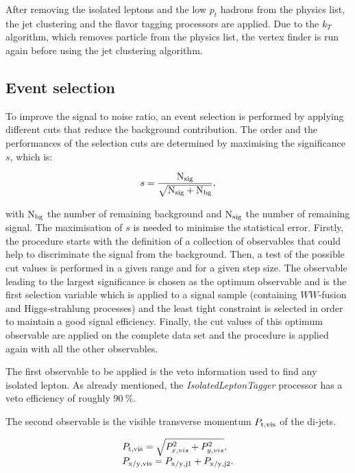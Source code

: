     After removing the isolated leptons and the low $p_{t}$ hadrons from the physics list, the jet clustering and the flavor tagging processors are applied. 
    Due to the $k_{T}$ algorithm, which removes particle from the physics list, the vertex finder is run again before using the jet clustering algorithm.

  \subsection{Event selection}

  To improve the signal to noise ratio, an event selection is performed by applying different cuts that reduce the background contribution.
  The order and the performances of the selection cuts are determined by maximising the significance $s$, which is:

  \begin{equation}
    s = \frac{\rm{N_{sig}}}{\sqrt{\rm{N_{sig}}+ \rm{N_{bg}}}},
  \end{equation}
  
  with $\rm{N_{bg}}$ the number of remaining background and $\rm{N_{sig}}$ the number of remaining signal.
  The maximisation of $s$ is needed to minimise the statistical error.
  Firstly, the procedure starts with the definition of a collection of observables that could help to discriminate the signal from the background.
  Then, a test of the possible cut values is performed in a given range and for a given step size.
  The observable leading to the largest significance is chosen as the optimum observable and is the first selection variable which is applied to a signal sample (containing $WW$-fusion and Higgs-strahlung processes) and the least tight constraint is selected in order to maintain a good signal efficiency.
  Finally, the cut values of this optimum observable are applied on the complete data set and the procedure is applied again with all the other observables.

  The first observable to be applied is the veto information used to find any isolated lepton.
  As already mentioned, the \textit{IsolatedLeptonTagger} processor has a veto efficiency of roughly $90~\%$. 

  The second observable is the visible transverse momentum $P_{\rm{t,vis}}$ of the di-jets. 

  \begin{equation}
    \begin{array}{lcl}
      P_{\rm{t,vis}} = \sqrt{P^2_{x,vis} + P^2_{y,vis}}, \\
      P_{\rm{x/y,vis}} = P_{\rm{x/y,j1}} + P_{\rm{x/y,j2}}. 
    \end{array}
  \end{equation}
 
